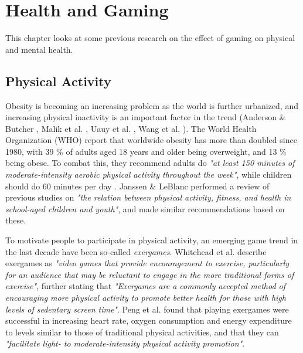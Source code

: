 \chapter{Health and Gaming}
\label{chapter:lit-study-modern-health}

This chapter looks at some previous research on the effect of gaming on physical and mental health.

\section{Physical Activity}
\label{sec:lit-study-physical-activity}

Obesity is becoming an increasing problem as the world is further urbanized, and increasing physical inactivity is an important factor in the trend (Anderson \& Butcher \cite{anderson2006childhood}, Malik et al. \cite{malik2013global}, Uauy et al. \cite{uauy2001obesity}, Wang et al. \cite{wang2011health}). The World Health Organization (WHO) \cite{WHOobesity} report that worldwide obesity has more than doubled since 1980, with 39 \% of adults aged 18 years and older being overweight, and 13 \% being obese. To combat this, they recommend adults do \emph{"at least 150 minutes of moderate-intensity aerobic physical activity throughout the week"}, while children should do 60 minutes per day \cite{WHOphysical}. Janssen \& LeBlanc \cite{janssen2010systematic} performed a review of previous studies on \emph{"the relation between physical activity, fitness, and health in school-aged children and youth"}, and made similar recommendations based on these.

To motivate people to participate in physical activity, an emerging game trend in the last decade have been so-called \emph{exergames}. Whitehead et al. \cite{whitehead2010exergame} describe exergames as \emph{"video games that provide encouragement to exercise, particularly for an audience that may be reluctant to engage in the more traditional forms of exercise"}, further stating that \emph{"Exergames are a commonly accepted method of encouraging more physical activity to promote better health for those with high levels of sedentary screen time"}. Peng et al. \cite{peng2011playing} found that playing exergames were successful in increasing heart rate, oxygen consumption and energy expenditure to levels similar to those of traditional physical activities, and that they can \emph{"facilitate light- to moderate-intensity physical activity promotion"}.

